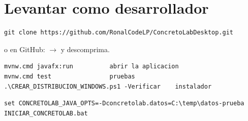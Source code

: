 \section{Levantar como desarrollador}
\label{sec:m-desarrollador}



\begin{verbatim}
git clone https://github.com/RonalCodeLP/ConcretoLabDesktop.git
\end{verbatim}

\noindent o en GitHub:  $\rightarrow$  y descomprima.



\begin{verbatim}
mvnw.cmd javafx:run          abrir la aplicacion
mvnw.cmd test                pruebas
.\CREAR_DISTRIBUCION_WINDOWS.ps1 -Verificar    instalador
\end{verbatim}


\begin{verbatim}
set CONCRETOLAB_JAVA_OPTS=-Dconcretolab.datos=C:\temp\datos-prueba
INICIAR_CONCRETOLAB.bat
\end{verbatim}
